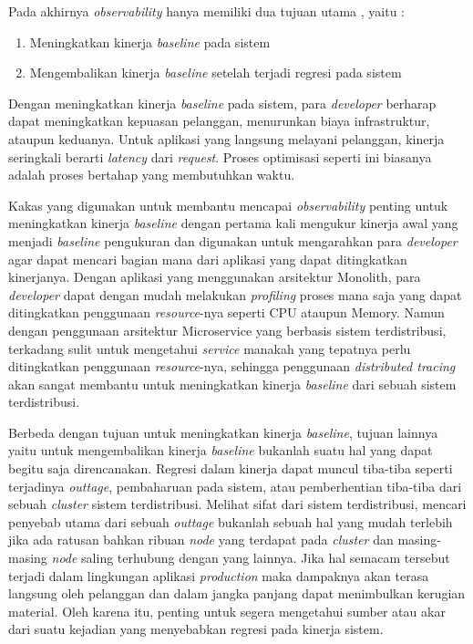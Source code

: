 Pada akhirnya \textit{observability} hanya memiliki dua tujuan utama \citep{parker2020distributed}, yaitu :
\begin{enumerate}
	\item Meningkatkan kinerja  \textit{baseline} pada sistem
	\item Mengembalikan kinerja \textit{baseline} setelah terjadi regresi pada sistem
\end{enumerate}

Dengan meningkatkan kinerja \textit{baseline} pada sistem, para \textit{developer} berharap dapat meningkatkan kepuasan pelanggan, menurunkan biaya infrastruktur, ataupun keduanya. Untuk aplikasi yang langsung melayani pelanggan, kinerja seringkali berarti \textit{latency} dari \textit{request}. Proses optimisasi seperti ini biasanya adalah proses bertahap yang membutuhkan waktu.

Kakas yang digunakan untuk membantu mencapai \textit{observability} penting untuk meningkatkan kinerja \textit{baseline} dengan pertama kali mengukur kinerja awal yang menjadi \textit{baseline} pengukuran dan digunakan untuk mengarahkan para \textit{developer} agar dapat mencari bagian mana dari aplikasi yang dapat ditingkatkan kinerjanya. Dengan aplikasi yang menggunakan arsitektur Monolith, para \textit{developer} dapat dengan mudah melakukan \textit{profiling} proses mana saja yang dapat ditingkatkan penggunaan \textit{resource}-nya seperti CPU ataupun Memory. Namun dengan penggunaan arsitektur Microservice yang berbasis sistem terdistribusi, terkadang sulit untuk mengetahui \textit{service} manakah yang tepatnya perlu ditingkatkan penggunaan \textit{resource}-nya, sehingga penggunaan \textit{distributed tracing} akan sangat membantu untuk meningkatkan kinerja \textit{baseline} dari sebuah sistem terdistribusi.

Berbeda dengan tujuan untuk meningkatkan kinerja \textit{baseline}, tujuan lainnya yaitu untuk mengembalikan kinerja \textit{baseline} bukanlah suatu hal yang dapat begitu saja direncanakan. Regresi dalam kinerja dapat muncul tiba-tiba seperti terjadinya \textit{outtage}, pembaharuan pada sistem, atau pemberhentian tiba-tiba dari sebuah \textit{cluster} sistem terdistribusi. Melihat sifat dari sistem terdistribusi, mencari penyebab utama dari sebuah \textit{outtage} bukanlah sebuah hal yang mudah terlebih jika ada ratusan bahkan ribuan \textit{node} yang terdapat pada \textit{cluster} dan masing-masing \textit{node} saling terhubung dengan yang lainnya. Jika hal semacam tersebut terjadi dalam lingkungan aplikasi \textit{production} maka dampaknya akan terasa langsung oleh pelanggan dan dalam jangka panjang dapat menimbulkan kerugian material. Oleh karena itu, penting untuk segera mengetahui sumber atau akar dari suatu kejadian yang menyebabkan regresi pada kinerja sistem.



